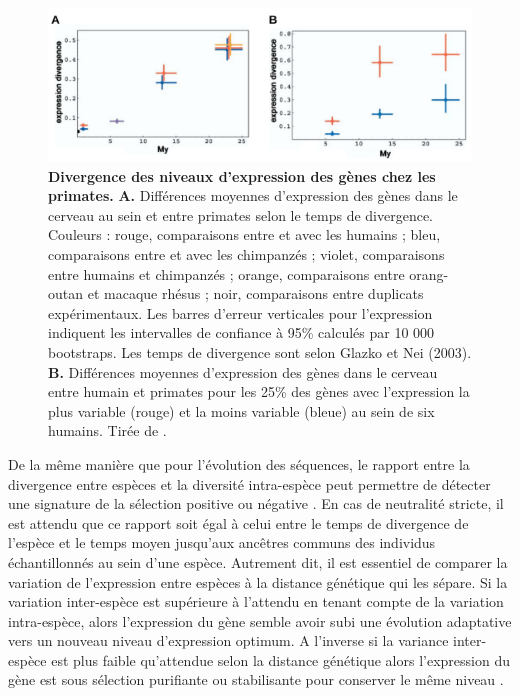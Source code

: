 \begin{figure}[h]
    \centering
    \includegraphics[width=1\textwidth, page=1] {figures/introduction/fig24.png}
    \caption[Divergence des niveaux d'expression des gènes chez les primates.]{
    \textbf{Divergence des niveaux d'expression des gènes chez les primates.}
    \textbf{A.} Différences moyennes d'expression des gènes dans le cerveau au sein et entre primates selon le temps de divergence. Couleurs : rouge, comparaisons entre et avec les humains ; bleu, comparaisons entre et avec les chimpanzés ; violet, comparaisons entre humains et chimpanzés ; orange, comparaisons entre orang-outan et macaque rhésus ; noir, comparaisons entre duplicats expérimentaux.  Les barres d'erreur verticales pour l'expression indiquent les intervalles de confiance à 95\% calculés par 10 000 bootstraps. Les temps de divergence sont selon Glazko et Nei (2003). \textbf{B.} Différences moyennes d'expression des gènes dans le cerveau entre humain et primates pour les 25\% des gènes avec l'expression la plus variable (rouge) et la moins variable (bleue) au sein de six humains. Tirée de \citep{khaitovich_neutral_2004}.\\
    }
    \label{fig:Fig24}
\end{figure} 

De la même manière que pour l’évolution des séquences, le rapport entre la divergence entre espèces et la diversité intra-espèce peut permettre de détecter une signature de la sélection positive ou négative \citep{mcdonald_adaptive_1991}. En cas de neutralité stricte, il est attendu que ce rapport soit égal à celui entre le temps de divergence de l'espèce et le temps moyen jusqu'aux ancêtres communs des individus échantillonnés au sein d'une espèce. Autrement dit, il est essentiel de comparer la variation de l’expression entre espèces à la distance génétique qui les sépare. Si la variation inter-espèce est supérieure à l’attendu en tenant compte de la variation intra-espèce, alors l’expression du gène semble avoir subi une évolution adaptative vers un nouveau niveau d’expression optimum. A l’inverse si la variance inter-espèce est plus faible qu’attendue selon la distance génétique alors l’expression du gène est sous sélection purifiante ou stabilisante pour conserver le même niveau \citep{khaitovich_neutral_2004}.

